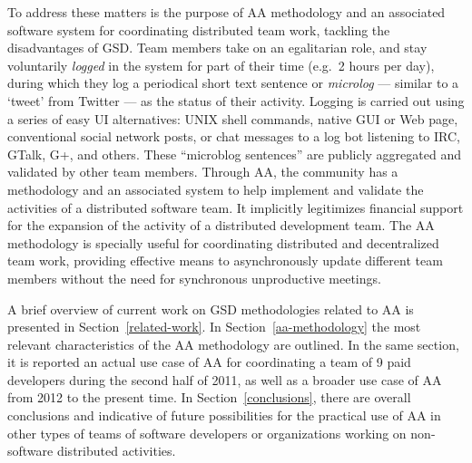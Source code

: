 \documentclass{article}
\newcommand{\indraftnote}[1]{}
\newcommand{\todo}[1]{\indraftnote{todo: #1}}
\begin{document}
To address these matters is the purpose of
AA methodology and an associated software system
for coordinating distributed team work, tackling the disadvantages
of GSD. Team members take on an egalitarian role, and stay
voluntarily \textit{logged} in the system for part of their time
(e.g.\ 2 hours per day), during which they log a periodical short text
sentence or \emph{microlog} --- similar to a `tweet' from Twitter --- as the
status of their activity. Logging is carried out using a series of
easy UI alternatives: UNIX shell
commands, native GUI or Web page, conventional social network posts, or chat messages to a log bot
listening to IRC, GTalk, G+, and others.  These ``microblog sentences'' are
publicly aggregated and validated by other team members. Through AA, the
community has a
methodology and an associated system to help
implement and validate the activities of a distributed software team. It implicitly
legitimizes financial support for the expansion of the activity of a
distributed development team. The AA methodology is specially useful for
coordinating distributed and decentralized team work, providing effective means
to asynchronously update different team members without the need for synchronous
unproductive meetings.


A brief overview of current work on GSD methodologies related to AA is presented
in Section~\ref{related-work}. In Section~\ref{aa-methodology} the most relevant
characteristics of the AA methodology are outlined. In the same section, it
is reported an actual use case of AA for coordinating a team of 9 paid developers 
during the second half of 2011, as well as a broader use case of AA from 2012 to
the present time.  In Section~\ref{conclusions}, there are overall conclusions
and indicative of future possibilities for the practical use of AA in other types of
teams of software developers or organizations working on non-software distributed
activities.

\indraftnote{
A very good article on the value of asynchronous communication for personal
and group productivity, related to the key necessity of having moments of
introversion to avoid daily pressures of forced socialization. The way we work
on the digital age enables people to be very productive, the article also
mentions Linux as a hallmark example~\cite{Thompson:Wired:2012}
}
\end{document}
